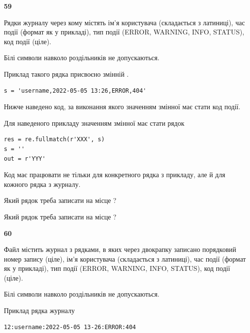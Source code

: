\newpage

{\begin {center}\textbf{ 59}\end {center}}\par
Рядки журналу через кому містять ім'я користувача (складається з латиниці), час події (фор\-мат як у прикладі), тип події (ERROR, WARNING, INFO, STATUS), код події (ціле).

Білі символи навколо роздільників не допускаються.

Приклад такого рядка присвоєно змінній .



\begin{verbatim}
s = 'username,2022-05-05 13:26,ERROR,404'
\end{verbatim}


Нижче наведено код, за виконання якого значенням змінної  має стати код події.

Для наведеного прикладу значенням змінної  має стати рядок 



\begin{verbatim}
res = re.fullmatch(r'XXX', s)
s = ''
out = r'YYY'
\end{verbatim}


Код має працювати не тільки для конкретного рядка з прикладу, але й для кожного рядка з журналу.




Який рядок треба записати на місце  ?\par
\vspace{5mm}


Який рядок треба записати на місце  ?\par


\newpage

{\begin {center}\textbf{ 60}\end {center}}\par
Файл  містить журнал з рядками, в яких через двокрапку записано поряд\-ко\-вий номер запису (ціле), ім'я користувача (складається з латиниці), час події (фор\-мат як у прикладі), тип події (ERROR, WARNING, INFO, STATUS), код події (ціле).

Білі символи навколо роздільників не допускаються.

Приклад рядка журналу



\begin{verbatim}
12:username:2022-05-05 13-26:ERROR:404
\end{verbatim}


